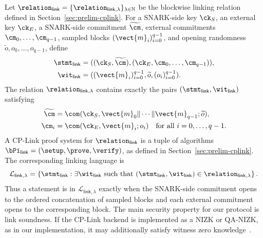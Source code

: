 Let
\(\relation_{\mathsf{link}}
=\{\relation_{\mathsf{link},\lambda}\}_{\lambda\in\mathbb{N}}\)
be the blockwise linking relation defined in Section~\ref{sec:prelim-cplink}.
For a SNARK-side key \(\ck_S\), an external key \(\ck_E\), a SNARK-side
commitment \(\widetilde{\cm}\), external commitments
\(\cm_0,\ldots,\cm_{q-1}\), sampled blocks
\((\vect{m}_i)_{i=0}^{q-1}\), and opening randomness
\(\widetilde{o},o_0,\ldots,o_{q-1}\), define
\[
\begin{aligned}
\stmt_{\mathsf{link}}
&=
((\ck_S,\widetilde{\cm}),
(\ck_E,\cm_0,\ldots,\cm_{q-1})),\\
\wit_{\mathsf{link}}
&=
((\vect{m}_i)_{i=0}^{q-1},\widetilde{o},(o_i)_{i=0}^{q-1}).
\end{aligned}
\]
The relation \(\relation_{\mathsf{link},\lambda}\) contains exactly the pairs
\((\stmt_{\mathsf{link}},\wit_{\mathsf{link}})\) satisfying
\[
\begin{aligned}
\widetilde{\cm}
&=
\com(\ck_S,\vect{m}_0\|\cdots\|\vect{m}_{q-1};\widetilde{o}),\\
\cm_i
&=
\com(\ck_E,\vect{m}_i;o_i)
\quad \text{for all } i=0,\ldots,q-1.
\end{aligned}
\]
A CP-Link proof system for \(\relation_{\mathsf{link}}\) is a tuple of
algorithms
\(\bPi_{\mathsf{link}}=(\setup,\prove,\verify)\), as defined in
Section~\ref{sec:prelim-cplink}.  The corresponding linking language is
\[
  \mathcal{L}_{\mathsf{link},\lambda}
  =
  \left\{
    \stmt_{\mathsf{link}}
    :
    \exists \wit_{\mathsf{link}}
    \text{ such that }
    (\stmt_{\mathsf{link}},\wit_{\mathsf{link}})
    \in
    \relation_{\mathsf{link},\lambda}
  \right\}.
\]
Thus a statement is in \(\mathcal{L}_{\mathsf{link},\lambda}\) exactly when
the SNARK-side commitment opens to the ordered concatenation of sampled blocks
and each external commitment opens to the corresponding block.  The main
security property for our protocol is link soundness.  If the CP-Link backend
is implemented as a NIZK or QA-NIZK, as in our implementation, it may
additionally satisfy witness zero knowledge~\cite{legosnark,qa-nizk}. \\

